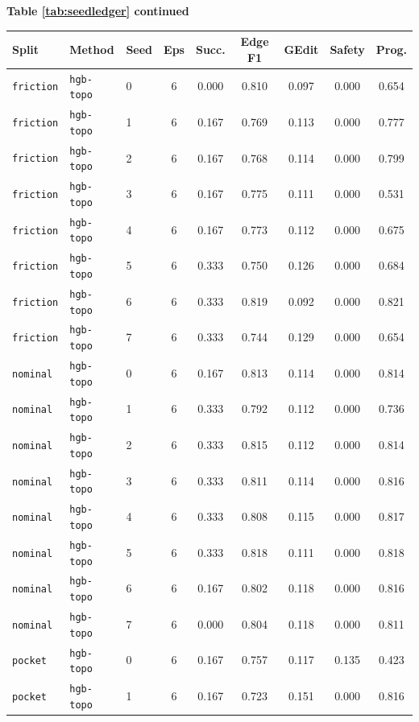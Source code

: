\documentclass{article}
\begin{document}
\begin{center}
\textbf{Table \ref{tab:seedledger} continued}\\[0.4ex]
\begin{tabular}{lllcccccc}
\toprule
Split & Method & Seed & Eps & Succ. & Edge F1 & GEdit & Safety & Prog. \\
\midrule
\texttt{friction} & \texttt{hgb-topo} & 0 & 6 & 0.000 & 0.810 & 0.097 & 0.000 & 0.654 \\
\texttt{friction} & \texttt{hgb-topo} & 1 & 6 & 0.167 & 0.769 & 0.113 & 0.000 & 0.777 \\
\texttt{friction} & \texttt{hgb-topo} & 2 & 6 & 0.167 & 0.768 & 0.114 & 0.000 & 0.799 \\
\texttt{friction} & \texttt{hgb-topo} & 3 & 6 & 0.167 & 0.775 & 0.111 & 0.000 & 0.531 \\
\texttt{friction} & \texttt{hgb-topo} & 4 & 6 & 0.167 & 0.773 & 0.112 & 0.000 & 0.675 \\
\texttt{friction} & \texttt{hgb-topo} & 5 & 6 & 0.333 & 0.750 & 0.126 & 0.000 & 0.684 \\
\texttt{friction} & \texttt{hgb-topo} & 6 & 6 & 0.333 & 0.819 & 0.092 & 0.000 & 0.821 \\
\texttt{friction} & \texttt{hgb-topo} & 7 & 6 & 0.333 & 0.744 & 0.129 & 0.000 & 0.654 \\
\texttt{nominal} & \texttt{hgb-topo} & 0 & 6 & 0.167 & 0.813 & 0.114 & 0.000 & 0.814 \\
\texttt{nominal} & \texttt{hgb-topo} & 1 & 6 & 0.333 & 0.792 & 0.112 & 0.000 & 0.736 \\
\texttt{nominal} & \texttt{hgb-topo} & 2 & 6 & 0.333 & 0.815 & 0.112 & 0.000 & 0.814 \\
\texttt{nominal} & \texttt{hgb-topo} & 3 & 6 & 0.333 & 0.811 & 0.114 & 0.000 & 0.816 \\
\texttt{nominal} & \texttt{hgb-topo} & 4 & 6 & 0.333 & 0.808 & 0.115 & 0.000 & 0.817 \\
\texttt{nominal} & \texttt{hgb-topo} & 5 & 6 & 0.333 & 0.818 & 0.111 & 0.000 & 0.818 \\
\texttt{nominal} & \texttt{hgb-topo} & 6 & 6 & 0.167 & 0.802 & 0.118 & 0.000 & 0.816 \\
\texttt{nominal} & \texttt{hgb-topo} & 7 & 6 & 0.000 & 0.804 & 0.118 & 0.000 & 0.811 \\
\texttt{pocket} & \texttt{hgb-topo} & 0 & 6 & 0.167 & 0.757 & 0.117 & 0.135 & 0.423 \\
\texttt{pocket} & \texttt{hgb-topo} & 1 & 6 & 0.167 & 0.723 & 0.151 & 0.000 & 0.816 \\

\end{tabular}
\end{center}
\end{document}
